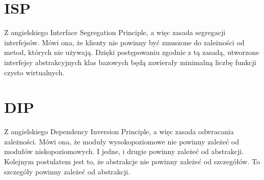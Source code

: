 \section{ISP}
Z angielskiego Interface Segregation Principle, a więc zasada segregacji interfejsów.
Mówi ona, że klienty nie powinny być zmuszone do zależności od metod, których nie używają.\autocite[151]{martin2015zwinne}
Dzięki postępowaniu zgodnie z tą zasadą, utworzone interfejsy abstrakcyjnych klas bazowych będą zawierały minimalną liczbę funkcji czysto wirtualnych.

\section{DIP}
Z angielskiego Dependency Inversion Principle, a więc zasada odwracania zależności.
Mówi ona, że moduły wysokopoziomowe nie powinny zależeć od modułów niskopoziomowych. I jedne, i drugie powinny zależeć od abstrakcji.\autocite[141]{martin2015zwinne}
Kolejnym postulatem jest to, że abstrakcje nie powinny zależeć od szczegółów. To szczegóły powinny zależeć od abstrakcji.\autocite[141]{martin2015zwinne}
